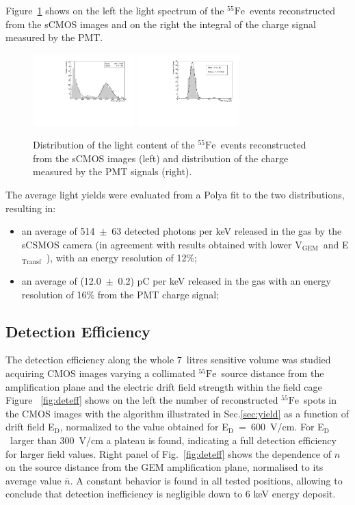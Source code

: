 \documentclass[physics,article,submit,moreauthors,pdftex]{Definitions/mdpi}
\newcommand{\fe}{\ensuremath{^{55}\textrm{Fe}}\xspace}
\newcommand{\Ed}  {E$_{\mathrm{D}}$\xspace}
\newcommand{\Et}  {E$_{\mathrm{Transf}}$\xspace}
\newcommand{\Vg}  {V$_{\mathrm{GEM}}$\xspace}
\begin{document}
Figure~\ref{fig:light} shows on the left the light spectrum of the \fe\ events reconstructed from the sCMOS images and on the right the integral of the charge signal measured by the PMT.

\begin{figure}[t!]
\centering
\includegraphics[width=0.35\textwidth]{DB_Integral_6040.pdf}
\includegraphics[width=0.35\textwidth]{newlightCharge_Run1834_Mix60-40.pdf}
\caption{Distribution of the light content of the \fe~events reconstructed from the sCMOS images  (left) and distribution of the charge measured by the PMT signals (right).} 
\label{fig:light}
\end{figure}

The average light yields were evaluated from a Polya fit \cite{bib:rolandiblum} to the two distributions, resulting in:
\begin{itemize}
    \item an average of 514~$\pm$~63 detected photons per keV released in the gas by the sCSMOS camera (in agreement with results obtained with lower \Vg\ and \Et\ \cite{bib:fe55}), with an energy resolution of 12\%;
    \item an average of (12.0~$\pm$~0.2) pC per keV released in the gas with an energy resolution of 16\% from the PMT charge signal;
\end{itemize}

\subsection{Detection Efficiency}

The detection efficiency along the whole 7~litres sensitive volume was studied acquiring CMOS images varying a collimated \fe\ source distance from the amplification plane and the electric drift field strength within the field cage Figure ~\ref{fig:deteff} shows on the left the number of reconstructed \fe\ spots in the CMOS images with the algorithm illustrated in Sec.\ref{sec:yield} as a function of drift field \Ed, normalized to the value obtained for \Ed~=~600~V/cm. For \Ed\ larger than 300~V/cm a plateau is found, indicating  a full detection efficiency for larger field values. Right panel of Fig.~\ref{fig:deteff} shows the dependence of $n$ on the source distance from the GEM amplification plane, normalised to its average value $\overline{n}$. A constant behavior is found in all tested positions, allowing to conclude that detection inefficiency is negligible down to 6 keV energy deposit.
\end{document}

